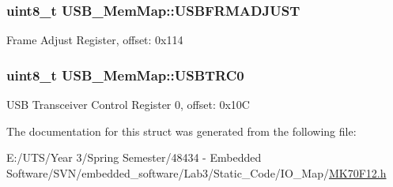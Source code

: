 \subsubsection[{U\+S\+B\+F\+R\+M\+A\+D\+J\+U\+S\+T}]{\setlength{\rightskip}{0pt plus 5cm}uint8\+\_\+t U\+S\+B\+\_\+\+Mem\+Map\+::\+U\+S\+B\+F\+R\+M\+A\+D\+J\+U\+S\+T}\label{struct_u_s_b___mem_map_a1bb1b3975dfcbbe78635e2d08b16553d}
Frame Adjust Register, offset\+: 0x114 \hypertarget{struct_u_s_b___mem_map_a10d494a848ee49ff264d62eb0bfb439e}{}
\subsubsection[{U\+S\+B\+T\+R\+C0}]{\setlength{\rightskip}{0pt plus 5cm}uint8\+\_\+t U\+S\+B\+\_\+\+Mem\+Map\+::\+U\+S\+B\+T\+R\+C0}\label{struct_u_s_b___mem_map_a10d494a848ee49ff264d62eb0bfb439e}
U\+S\+B Transceiver Control Register 0, offset\+: 0x10\+C 

The documentation for this struct was generated from the following file\+:\begin{DoxyCompactItemize}
\item 
E\+:/\+U\+T\+S/\+Year 3/\+Spring Semester/48434 -\/ Embedded Software/\+S\+V\+N/embedded\+\_\+software/\+Lab3/\+Static\+\_\+\+Code/\+I\+O\+\_\+\+Map/\hyperlink{_m_k70_f12_8h}{M\+K70\+F12.\+h}\end{DoxyCompactItemize}
